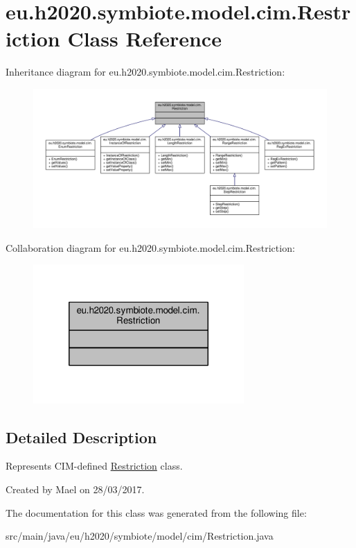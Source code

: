 \hypertarget{classeu_1_1h2020_1_1symbiote_1_1model_1_1cim_1_1Restriction}{}\section{eu.\+h2020.\+symbiote.\+model.\+cim.\+Restriction Class Reference}
\label{classeu_1_1h2020_1_1symbiote_1_1model_1_1cim_1_1Restriction}


Inheritance diagram for eu.\+h2020.\+symbiote.\+model.\+cim.\+Restriction\+:\nopagebreak
\begin{figure}[H]
\begin{center}
\leavevmode
\includegraphics[width=350pt]{classeu_1_1h2020_1_1symbiote_1_1model_1_1cim_1_1Restriction__inherit__graph}
\end{center}
\end{figure}


Collaboration diagram for eu.\+h2020.\+symbiote.\+model.\+cim.\+Restriction\+:\nopagebreak
\begin{figure}[H]
\begin{center}
\leavevmode
\includegraphics[width=228pt]{classeu_1_1h2020_1_1symbiote_1_1model_1_1cim_1_1Restriction__coll__graph}
\end{center}
\end{figure}


\subsection{Detailed Description}
Represents C\+I\+M-\/defined \hyperlink{classeu_1_1h2020_1_1symbiote_1_1model_1_1cim_1_1Restriction}{Restriction} class.

Created by Mael on 28/03/2017. 

The documentation for this class was generated from the following file\+:\begin{DoxyCompactItemize}
\item 
src/main/java/eu/h2020/symbiote/model/cim/Restriction.\+java\end{DoxyCompactItemize}
